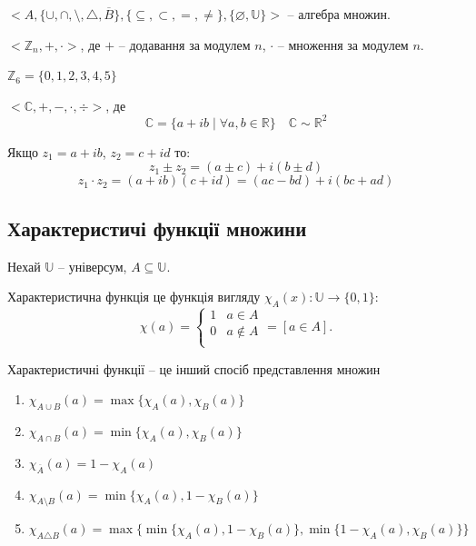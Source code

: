 \begin{example}
    $<A,
    \{ \cup, \cap, \setminus, \triangle, \overline{B} \},
    \{ \subseteq, \subset, =, \neq \},
    \{ \varnothing, \mathbb{U} \}>$
    -- алгебра множин.
\end{example}

\begin{example}
    $<\mathbb{Z}_n, +, \cdot>$, де
    $+$ -- додавання за модулем $n$,
    $\cdot$ -- множення за модулем $n$.
\end{example}

\begin{example}
    $\mathbb{Z}_6 = \{0, 1, 2, 3, 4, 5\}$

    
    
\end{example}

\begin{example}
    $<\mathbb{C}, +, -, \cdot, \div>$, де
    $$\mathbb{C} = \{ a + ib \mid \forall a, b \in \mathbb{R} \} \quad \mathbb{C} \sim \mathbb{R}^2$$

    Якщо $z_1 = a + ib$, $z_2 = c + id$ то:
    $$z_1 \pm z_2 = (a \pm c) + i(b \pm d)$$
    $$z_1 \cdot z_2 = (a + ib)(c + id) = (ac - bd) + i(bc + ad)$$
\end{example}



\subsection{Характеристичі функції множини}

Нехай $\mathbb{U}$ -- універсум, $A \subseteq \mathbb{U}$.

\begin{definition}
    Характеристична функція це функція вигляду $\chi_A(x): \mathbb{U} \rightarrow \{0, 1\}$:
    $$\chi(a) = \left\{ \begin{array}{ll}
        1 & a \in A \\
        0 & a \notin A \\
    \end{array} \right. = [a \in A].$$
\end{definition}

Характеристичні функції -- це інший спосіб
представлення множин

\begin{theorem}
    \begin{enumerate}
        \item $\chi_{A \cup B}(a) = \max \{ \chi_A(a), \chi_B(a) \}$
        \item $\chi_{A \cap B}(a) = \min \{ \chi_A(a), \chi_B(a) \}$
        \item $\chi_{\overline{A}}(a) = 1 - \chi_A(a)$
        \item $\chi_{A \setminus B}(a) = \min \{ \chi_A(a), 1 - \chi_B(a) \}$
        \item $\chi_{A \triangle B}(a) = \max\{ \min \{ \chi_A(a), 1 - \chi_B(a) \}, \min \{ 1 - \chi_A(a), \chi_B(a) \} \}$
    \end{enumerate}
\end{theorem}

